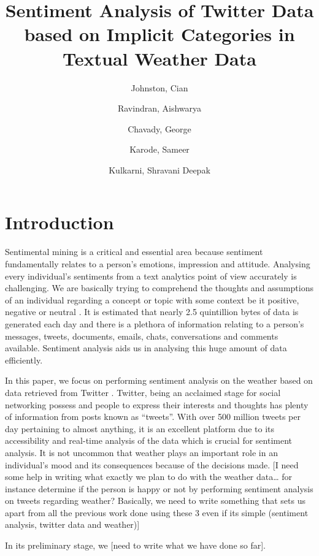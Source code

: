\documentclass[a4paper,10pt]{article}
\begin{document}
\title{Sentiment Analysis of Twitter Data based on Implicit Categories in Textual Weather Data}
\author{
    Johnston, Cian
    \and
    Ravindran, Aishwarya
    \and
    Chavady, George
    \and
    Karode, Sameer
    \and
    Kulkarni, Shravani Deepak
}

\maketitle
\section{Introduction}

Sentimental mining is a critical and essential area because sentiment fundamentally relates to a person’s emotions, impression and attitude. Analysing every individual’s sentiments from a text analytics point of view accurately is challenging. We are basically trying to comprehend the thoughts and assumptions of an individual regarding a concept or topic with some context be it positive, negative or neutral . It is estimated that nearly 2.5 quintillion bytes of data is generated each day  and there is a plethora of information relating to a person’s messages, tweets, documents, emails, chats, conversations and comments available. Sentiment analysis aids us in analysing this huge amount of data efficiently.

In this paper, we focus on performing sentiment analysis on the weather based on data retrieved from Twitter . Twitter, being an acclaimed stage for social networking possess and people to express their interests and thoughts has plenty of information from posts known as “tweets”. With over 500 million tweets per day pertaining to almost anything, it is an excellent platform due to its accessibility and real-time analysis of the data which is crucial for sentiment analysis. It is not uncommon that weather plays an important role in an individual’s mood and its consequences because of the decisions made. [I need some help in writing what exactly we plan to do with the weather data… for instance determine if the person is happy or not by performing sentiment analysis on tweets regarding weather? Basically, we need to write something that sets us apart from all the previous work done using these 3 even if its simple (sentiment analysis, twitter data and weather)] 

In its preliminary stage, we [need to write what we have done so far].
\end{document}
